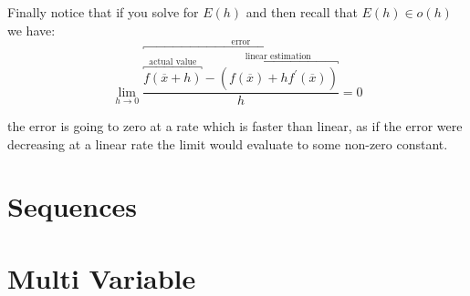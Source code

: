 Finally notice that if you solve for $ E\left( h \right) $ and then recall that $ E\left( h \right) \in o\left( h \right)  $ we have:
\[
\lim_{ h \to 0 } \frac{ \overbracket{\overbracket{f\left( \overline{x} +  h \right)}^{~\text{actual value}~ } -  \overbracket{\left( f\left( \overline{x}  \right)  +  h f ^{ \prime  } \left( \overline{x}  \right) \right)}^{~\text{linear estimation}~  }}^{~\text{error}~  } }{h}= 0
\]

the error is going to zero at a rate which is faster than linear, as if the error were decreasing at a linear rate the limit would evaluate to some non-zero constant.

\newpage
\section{Sequences}





\section{Multi Variable}


